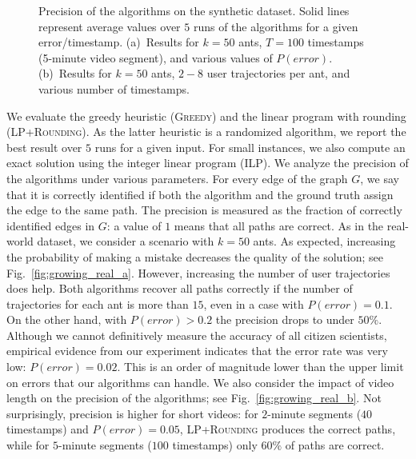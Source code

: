 \documentclass[runningheads]{llncs}
\newcommand{\alg}[1]{\textsc{#1}}
\begin{document}
\begin{figure}[t]
    \center
\hfill
    \caption{Precision of the algorithms on the synthetic dataset. Solid lines represent average values
    over $5$ runs of the algorithms for a given error/timestamp.
    (a)~Results for $k=50$ ants, $T=100$ timestamps (5-minute video segment), and
    various values of $P(error)$.
    (b)~Results for $k=50$ ants, $2-8$ user trajectories per ant, and various number of timestamps.}
    \label{fig:growing_real}
\end{figure}

We evaluate the greedy heuristic (\alg{Greedy}) and
the linear program with rounding (\alg{LP+Rounding}). As the latter
heuristic is a randomized algorithm, we report the best result over $5$ runs
for a given input. For small instances, we also compute
an exact solution using the integer linear program (\alg{ILP}).
We analyze the precision of the algorithms under various parameters. For every edge of the graph $G$,
we say that it is correctly identified if both the algorithm and the ground truth assign the edge to the same path.
The precision is measured as the fraction of correctly identified edges in $G$: a value of $1$ means
that all paths are correct.
As in the real-world dataset, we consider a scenario with $k=50$ ants. As expected, increasing the probability of making a mistake decreases the quality of the solution; see Fig.~\ref{fig:growing_real_a}. However,
increasing the number of user trajectories does help. Both algorithms recover all paths correctly
if the number of trajectories for each ant is more than $15$, even in a case with $P(error)=0.1$. On the other hand,
with $P(error)>0.2$ the precision drops to under $50\%$.
Although we cannot definitively measure the accuracy of all citizen scientists, empirical evidence from  our experiment indicates that the error rate was very low: $P(error) = 0.02$. This is an order of magnitude lower than the upper limit on errors that our algorithms can handle.
We also consider the impact of video length on the precision of the algorithms; see Fig.~\ref{fig:growing_real_b}.
Not surprisingly, precision is higher for short videos: for $2$-minute segments ($40$ timestamps) and $P(error)=0.05$,
\alg{LP+Rounding} produces the correct paths, while for $5$-minute segments ($100$ timestamps) only $60\%$ of paths are correct.
\end{document}
